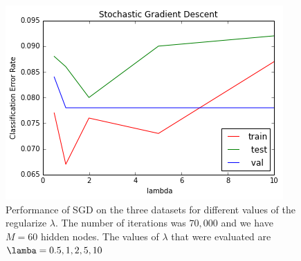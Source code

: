 \documentclass[10pt]{article}
\begin{document}
\begin{figure}
\centering
\includegraphics[scale=0.5]{SGD_minist_CER_lambda.png}
\caption{Performance of SGD on the three datasets for different values of the regularize $\lambda$. The number of iterations was $70,000$ and we have $M = 60$ hidden nodes. The values of $\lambda$ that were evaluated are $\lamba = {0.5, 1, 2, 5, 10}$}
\label{SGD_minist_CER_lambda}
\end{figure}
\end{document}
